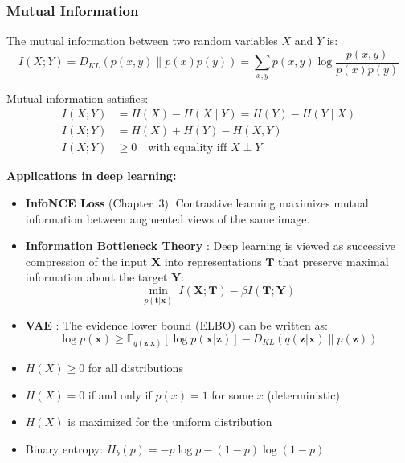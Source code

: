 \subsubsection{Mutual Information}

\begin{definition}
The mutual information between two random variables $X$ and $Y$ is:
\begin{equation}
I(X; Y) = D_{KL}(p(x, y) \| p(x)p(y)) = \sum_{x,y} p(x, y) \log \frac{p(x, y)}{p(x)p(y)}
\end{equation}
\end{definition}

Mutual information satisfies:
\begin{align}
I(X; Y) &= H(X) - H(X \mid Y) = H(Y) - H(Y \mid X) \\
I(X; Y) &= H(X) + H(Y) - H(X, Y) \\
I(X; Y) &\geq 0 \quad \text{with equality iff } X \perp Y
\end{align}

\textbf{Applications in deep learning:}
\begin{itemize}
    \item \textbf{InfoNCE Loss} (Chapter~3): Contrastive learning maximizes mutual information between augmented views of the same image.
    \item \textbf{Information Bottleneck Theory} \cite{tishby2015deep}: Deep learning is viewed as successive compression of the input $\mathbf{X}$ into representations $\mathbf{T}$ that preserve maximal information about the target $\mathbf{Y}$:
    \begin{equation}
    \min_{p(\mathbf{t}|\mathbf{x})} \; I(\mathbf{X}; \mathbf{T}) - \beta I(\mathbf{T}; \mathbf{Y})
    \end{equation}
    \item \textbf{VAE} \cite{kingma2013auto}: The evidence lower bound (ELBO) can be written as:
    \begin{equation}
    \log p(\mathbf{x}) \geq \mathbb{E}_{q(\mathbf{z}|\mathbf{x})}[\log p(\mathbf{x}|\mathbf{z})] - D_{KL}(q(\mathbf{z}|\mathbf{x}) \| p(\mathbf{z}))
    \end{equation}
\end{itemize}

\begin{property}
\begin{itemize}
    \item $H(X) \geq 0$ for all distributions
    \item $H(X) = 0$ if and only if $p(x) = 1$ for some $x$ (deterministic)
    \item $H(X)$ is maximized for the uniform distribution
    \item Binary entropy: $H_b(p) = -p\log p - (1-p)\log(1-p)$
\end{itemize}
\end{property}

